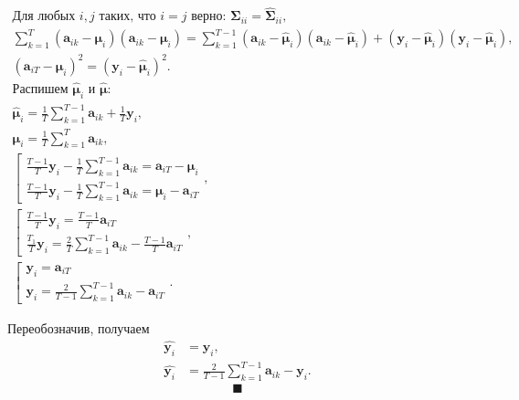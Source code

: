 \documentclass{article}
\begin{document}
\begin{gather*}
	\text{Для любых } i, j \text{ таких, что } i = j \text{ верно: } \mathbf{\Sigma}_{ii} = \hat{\mathbf{\Sigma}}_{ii},\\
	\sum_{k=1}^{T}(\mathbf{a}_{ik} - \boldsymbol{\mu}_i)(\mathbf{a}_{ik}-\boldsymbol{\mu}_i) = \sum_{k=1}^{T-1}(\mathbf{a}_{ik} - \hat{\boldsymbol{\mu}}_i)(\mathbf{a}_{ik}-\hat{\boldsymbol{\mu}}_i) + (\mathbf{y}_i - \hat{\boldsymbol{\mu}}_i)(\mathbf{y}_i - \hat{\boldsymbol{\mu}}_i),\\
	(\mathbf{a}_{iT}-\boldsymbol{\mu}_i)^2 = (\mathbf{y}_i-\hat{\boldsymbol{\mu}}_i)^2.\\
	\text{Распишем } \hat{\boldsymbol{\mu}}_i \text{ и } \hat{\boldsymbol{\mu}}:\\
	\hat{\boldsymbol{\mu}}_i = \frac{1}{T}\sum_{k=1}^{T-1}\mathbf{a}_{ik} + \frac{1}{T}\mathbf{y}_i,\\
	\boldsymbol{\mu}_i = \frac{1}{T}\sum_{k=1}^{T}\mathbf{a}_{ik},\\
	\left[
	\begin{array}{ll}
		\frac{T-1}{T}\mathbf{y}_i-\frac{1}{T}\sum_{k=1}^{T-1}\mathbf{a}_{ik}=\mathbf{a}_{iT}-\boldsymbol{\mu}_i
		\\[1ex]
		\frac{T-1}{T}\mathbf{y}_i-\frac{1}{T}\sum_{k=1}^{T-1}\mathbf{a}_{ik}=\boldsymbol{\mu}_i-\mathbf{a}_{iT}
	\end{array},
	\right .\\[1ex]
	\left[
	\begin{array}{ll}
		\frac{T-1}{T}\mathbf{y}_i = \frac{T-1}{T}\mathbf{a}_{iT}
		\\[1ex]
		\frac{T_1}{T}\mathbf{y}_i = \frac{2}{T} \sum_{k=1}^{T-1} \mathbf{a}_{ik} - \frac{T-1}{T}\mathbf{a}_{iT}
	\end{array},
	\right .\\[1ex]
	\left[
	\begin{array}{ll}
		\mathbf{y}_i = \mathbf{a}_{iT}
		\\[1ex]
		\mathbf{y}_i = \frac{2}{T-1} \sum_{k=1}^{T-1} \mathbf{a}_{ik} - \mathbf{a}_{iT}
	\end{array}.
	\right .
\end{gather*}

Переобозначив, получаем
\begin{align*}
	\hat{\mathbf{y}_i} &= \mathbf{y}_i,\\
	\hat{\mathbf{y}_i} &= \frac{2}{T-1} \sum_{k=1}^{T-1} \mathbf{a}_{ik} - \mathbf{y}_i.
\end{align*}
$$ \blacksquare $$
\end{document}
